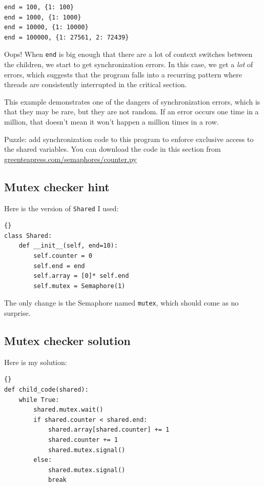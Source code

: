 \documentclass{book}
\newcommand{\clearemptydoublepage}{\newpage\cleardoublepage}
\begin{document}
\begin{verbatim}
end = 100, {1: 100}
end = 1000, {1: 1000}
end = 10000, {1: 10000}
end = 100000, {1: 27561, 2: 72439}
\end{verbatim}
%
Oops!  When {\tt end} is big enough that there are a lot of
context switches between the children, we start to get synchronization
errors.  In this case, we get a {\em lot} of errors, which suggests
that the program falls into a recurring pattern where threads are 
consistently interrupted in the critical section.

This example demonstrates one of the dangers of synchronization
errors, which is that they may be rare, but they are not random.
If an error occurs one time in a million, that doesn't mean it
won't happen a million times in a row.

Puzzle: add synchronization code to this program to enforce
exclusive access to the shared variables.  You can download the
code in this section from \url{greenteapress.com/semaphores/counter.py}


\clearemptydoublepage
\subsection {Mutex checker hint}

Here is the version of {\tt Shared} I used:

\begin{lstlisting}[caption={}]{}
class Shared:
    def __init__(self, end=10):
        self.counter = 0
        self.end = end
        self.array = [0]* self.end
        self.mutex = Semaphore(1)
\end{lstlisting}

The only change is the Semaphore named {\tt mutex}, which should
come as no surprise.

\clearemptydoublepage
\subsection {Mutex checker solution}

Here is my solution:

\begin{lstlisting}[caption={}]{}
def child_code(shared):
    while True:
        shared.mutex.wait()
        if shared.counter < shared.end:
            shared.array[shared.counter] += 1
            shared.counter += 1
            shared.mutex.signal()
        else:
            shared.mutex.signal()
            break
\end{lstlisting}
\end{document}
